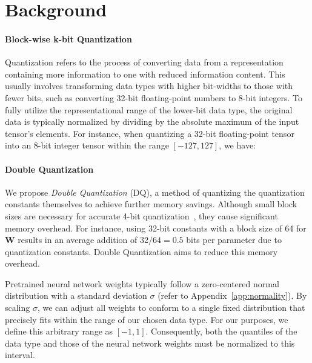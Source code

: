 \section{Background}
\paragraph{Block-wise k-bit Quantization} Quantization refers to the process of converting data from a representation containing more information to one with reduced information content. This usually involves transforming data types with higher bit-widths to those with fewer bits, such as converting 32-bit floating-point numbers to 8-bit integers. To fully utilize the representational range of the lower-bit data type, the original data is typically normalized by dividing by the absolute maximum of the input tensor's elements. For instance, when quantizing a 32-bit floating-point tensor into an 8-bit integer tensor within the range $[-127, 127]$, we have:

\paragraph{Double Quantization{}} 
We propose \emph{Double Quantization} (DQ), a method of quantizing the quantization constants themselves to achieve further memory savings. Although small block sizes are necessary for accurate 4-bit quantization~\citep{dettmers2022case}, they cause significant memory overhead. For instance, using 32-bit constants with a block size of 64 for $\mathbf{W}$ results in an average addition of $32/64 = 0.5$ bits per parameter due to quantization constants. Double Quantization aims to reduce this memory overhead.

Pretrained neural network weights typically follow a zero-centered normal distribution with a standard deviation $\sigma$ (refer to Appendix~\ref{app:normality}). By scaling $\sigma$, we can adjust all weights to conform to a single fixed distribution that precisely fits within the range of our chosen data type. For our purposes, we define this arbitrary range as $[-1, 1]$. Consequently, both the quantiles of the data type and those of the neural network weights must be normalized to this interval.

